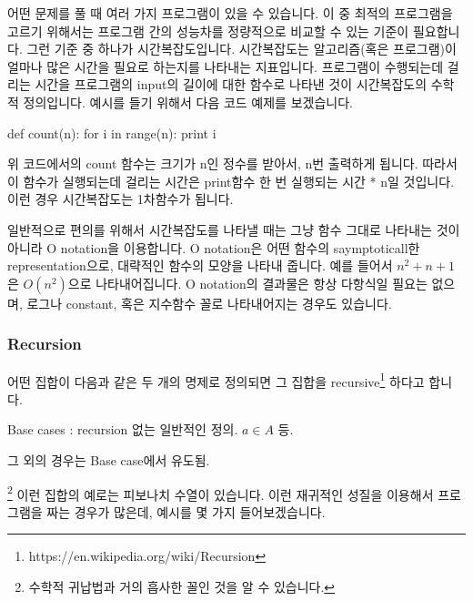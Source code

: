 어떤 문제를 풀 때 여러 가지 프로그램이 있을 수 있습니다. 이 중 최적의 프로그램을 고르기 위해서는 프로그램 간의 성능차를 정량적으로 비교할 수 있는 기준이 필요합니다. 그런 기준 중 하나가 시간복잡도입니다. 시간복잡도는 알고리즘(혹은 프로그램)이 얼마나 많은 시간을 필요로 하는지를 나타내는 지표입니다. 프로그램이 수행되는데 걸리는 시간을 프로그램의 input의 길이에 대한 함수로 나타낸 것이 시간복잡도의 수학적 정의입니다. 예시를 들기 위해서 다음 코드 예제를 보겠습니다. 

\begin{Python}
def count(n):
	for i in range(n):
		print i
\end{Python}

위 코드에서의 count 함수는 크기가 n인 정수를 받아서, n번 출력하게 됩니다. 따라서 이 함수가 실행되는데 걸리는 시간은 print함수 한 번 실행되는 시간 * n일 것입니다. 이런 경우 시간복잡도는 1차함수가 됩니다. 

일반적으로 편의를 위해서 시간복잡도를 나타낼 때는 그냥 함수 그대로 나타내는 것이 아니라 O notation을 이용합니다. O notation은 어떤 함수의 saymptoticall한 representation으로, 대략적인 함수의 모양을 나타내 줍니다. 예를 들어서 $n^2+n+1$은 $O(n^2
)$으로 나타내어집니다. O notation의 결과물은 항상 다항식일 필요는 없으며, 로그나 constant, 혹은 지수함수 꼴로 나타내어지는 경우도 있습니다. 

\subsubsection{Recursion}

어떤 집합이 다음과 같은 두 개의 명제로 정의되면 그 집합을 recursive\footnote{https://en.wikipedia.org/wiki/Recursion } 하다고 합니다. 
\begin{compactitem}
\item Base cases : recursion 없는 일반적인 정의. $a \in A$ 등. 
\item 그 외의 경우는 Base case에서 유도됨. 
\end{compactitem}
\footnote{수학적 귀납법과 거의 흡사한 꼴인 것을 알 수 있습니다.}
이런 집합의 예로는 피보나치 수열이 있습니다. 이런 재귀적인 성질을 이용해서 프로그램을 짜는 경우가 많은데, 예시를 몇 가지 들어보겠습니다. 

